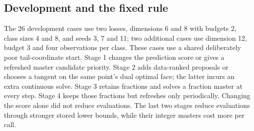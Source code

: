 \documentclass[11pt,a4paper]{article}
\begin{document}
\subsection{Development and the fixed rule}
The 26 development cases use two losses, dimensions 6 and 8 with budgets 2, class sizes 4 and 8, and seeds 3, 7 and 11; two additional cases use dimension 12, budget 3 and four observations per class. These cases use a shared deliberately poor tail-coordinate start.
Stage 1 changes the prediction score or gives a refreshed master candidate priority. Stage 2 adds data-ranked proposals or chooses a tangent on the same point's dual optimal face; the latter incurs an extra continuous solve. Stage 3 retains fractions and solves a fraction master at every step. Stage 4 keeps those fractions but refreshes only periodically. Changing the score alone did not reduce evaluations. The last two stages reduce evaluations through stronger stored lower bounds, while their integer masters cost more per call.
\end{document}
